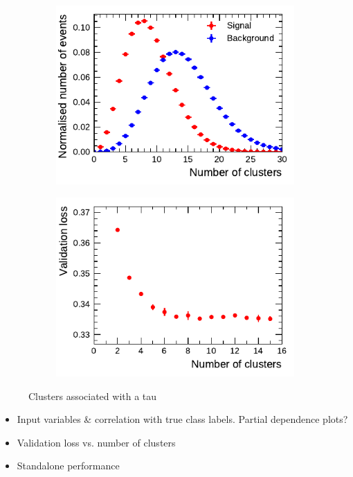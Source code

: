 \begin{figure}[ht]
  \begin{subfigure}[t]{0.48\textwidth}
    \centering
    \includegraphics{./figures/rnn/ncls_1p.pdf}
  \end{subfigure}%
  \begin{subfigure}[t]{0.48\textwidth}
    \centering
    \includegraphics{./figures/rnn/nscan/cluster_1p.pdf}
  \end{subfigure}
  \caption{Clusters associated with a tau}
  \label{fig:rnn_nclusters}
\end{figure}


\begin{itemize}
\item Input variables \& correlation with true class labels. Partial
  dependence plots?
\item Validation loss vs. number of clusters
\item Standalone performance
\end{itemize}

